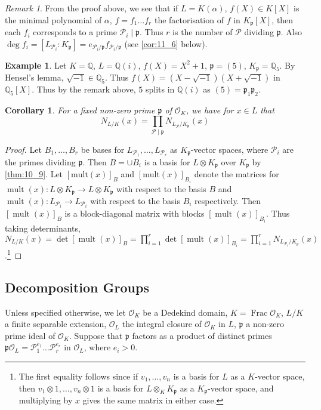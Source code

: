 \documentclass[11pt]{article}
\theoremstyle{definition}
\newtheorem*{example}{Example}
\theoremstyle{plain}
\newtheorem{corollary}[definition]{Corollary}
\theoremstyle{remark}
\newtheorem*{remark}{Remark}
\DeclareMathOperator{\Frac}{Frac}
\DeclareMathOperator{\mult}{mult}
\newcommand{\QQ}{\mathbb{Q}}
\newcommand{\cO}{\mathcal{O}}
\newcommand{\cP}{\mathcal{P}}
\newcommand{\fp}{\mathfrak{p}}
\begin{document}
\begin{remark}
    From the proof above, we see that if $L = K(\alpha)$, $f(X) \in K[X]$ is the minimal polynomial of $\alpha$, $f = f_1 \ldots f_r$ the factorisation of $f$ in $K_\fp[X]$, then each $f_i$ corresponds to a prime $\cP_i \mid \fp$. Thus $r$ is the number of $\cP$ dividing $\fp$. Also $\deg f_i = [L_{\cP_i} : K_\fp] = e_{\cP_i/\fp} f_{\cP_i/\fp}$ (see \autoref{cor:11_6} below).
\end{remark}

\begin{example}
    Let $K = \QQ$, $L = \QQ(i)$, $f(X) = X^2 + 1$, $\fp = (5)$, $K_\fp = \QQ_5$. By Hensel's lemma, $\sqrt{-1} \in \QQ_5$. Thus $f(X) = (X - \sqrt{-1})(X + \sqrt{-1})$ in $\QQ_5[X]$. Thus by the remark above, $5$ splits in $\QQ(i)$ as $(5) = \fp_1 \fp_2$.
\end{example}

\begin{corollary}\label{cor:10_10}
    For a fixed non-zero prime $\fp$ of $\cO_K$, we have for $x \in L$ that
    \begin{equation*}
        N_{L/K}(x) = \prod_{\cP \mid \fp} N_{L_\cP/K_\fp}(x)
    \end{equation*}
\end{corollary}
\begin{proof}
    Let $B_1, \ldots, B_r$ be bases for $L_{\cP_1}, \ldots, L_{\cP_r}$ as $K_\fp$-vector spaces, where $\cP_i$ are the primes dividing $\fp$. Then $B = \cup B_i$ is a basis for $L \otimes K_\fp$ over $K_\fp$ by \autoref{thm:10_9}. Let $[\mathrm{mult}(x)]_B$ and $[\mathrm{mult}(x)]_{B_i}$ denote the matrices for $\mult(x) : L \otimes K_\fp \to L \otimes K_\fp$ with respect to the basis $B$ and $\mult(x) : L_{\cP_i} \to L_{\cP_i}$ with respect to the basis $B_i$ respectively. Then $[\mult(x)]_B$ is a block-diagonal matrix with blocks $[\mult(x)]_{B_i}$. Thus taking determinants, $N_{L/K}(x) = \det [\mult(x)]_B = \prod_{i=1}^r \det [\mult(x)]_{B_i} = \prod_{i=1}^r N_{L_{\cP_i} / K_\fp}(x)$.\footnote{The first equality follows since if $v_1, \ldots, v_n$ is a basis for $L$ as a $K$-vector space, then $v_1 \otimes 1, \ldots, v_n \otimes 1$ is a basis for $L \otimes_K K_\fp$ as a $K_\fp$-vector space, and multiplying by $x$ gives the same matrix in either case.}
\end{proof}

\subsection{Decomposition Groups}
Unless specified otherwise, we let $\cO_K$ be a Dedekind domain, $K = \Frac{\cO_K}$, $L / K$ a finite separable extension, $\cO_L$ the integral closure of $\cO_K$ in $L$, $\fp$ a non-zero prime ideal of $\cO_K$. Suppose that $\fp$ factors as a product of distinct primes $\fp \cO_L = \cP_1^{e_1} \ldots \cP_r^{e_r}$ in $\cO_L$, where $e_i > 0$.
\end{document}
